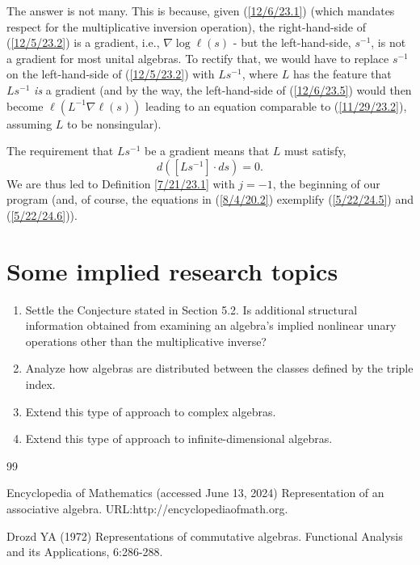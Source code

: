 \documentclass{amsart}
\numberwithin{equation}{section}
\theoremstyle{definition}
\numberwithin{theorem}{section}
\begin{document}
{The answer is not many.  This is because, given (\ref{12/6/23.1}) (which mandates respect for the multiplicative inversion operation), the right-hand-side of (\ref{12/5/23.2}) is a gradient, i.e., $\nabla\log \ell(s)$ - but the left-hand-side, $s^{-1}$,  is not a gradient for most unital algebras.  
To rectify that, we would have to replace $s^{-1}$ on the left-hand-side of (\ref{12/5/23.2}) with $Ls^{-1}$, where $L$ has the feature that $Ls^{-1}$ {\it is} a gradient (and by the way, the left-hand-side of (\ref{12/6/23.5}) would then become $\ell(L^{-1}\nabla\ell(s))$ leading to an equation comparable to  (\ref{11/29/23.2}), assuming $L$ to be nonsingular).   


The requirement that $Ls^{-1}$ be a gradient means that $L$ must satisfy, \[ d([Ls^{-1}]\cdot ds) = 0.\]  We are thus led to Definition \ref{7/21/23.1} with $j=-1$, the beginning of our program (and, of course, the equations in (\ref{8/4/20.2}) exemplify (\ref{5/22/24.5}) and (\ref{5/22/24.6})).

\vspace{1cm}

\section{Some implied research topics}
\begin{enumerate} \item Settle the Conjecture stated in Section 5.2. Is additional structural information obtained  from examining an algebra's implied nonlinear unary operations other than the multiplicative inverse?  \item Analyze how algebras are distributed between the classes defined by the triple index.  \item Extend this type of approach to complex algebras. \item Extend this type of approach to infinite-dimensional algebras. \end{enumerate}

\vspace{1cm}

  
   \begin{thebibliography}{99}
   
 Encyclopedia of Mathematics (accessed June 13, 2024) Representation of an associative algebra. URL:http://encyclopediaofmath.org.
   
     Drozd YA (1972) Representations of commutative algebras. Functional Analysis and its Applications, 6:286-288.
          

\end{thebibliography}}
\end{document}
